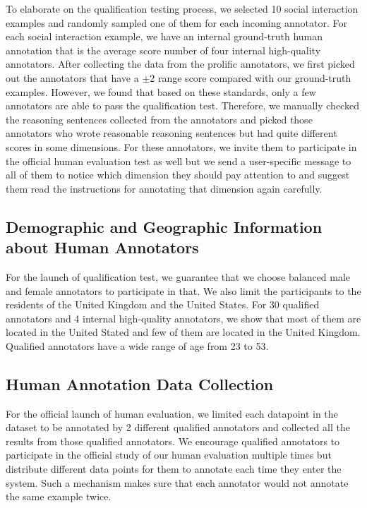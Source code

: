 To elaborate on the qualification testing process, we selected 10 social interaction examples and randomly sampled one of them for each incoming annotator. For each social interaction example, we have an internal ground-truth human annotation that is the average score number of four internal high-quality annotators. After collecting the data from the prolific annotators, we first picked out the annotators that have a $\pm$2 range score compared with our ground-truth examples. However, we found that based on these standards, only a few annotators are able to pass the qualification test. Therefore, we manually checked the reasoning sentences collected from the annotators and picked those annotators who wrote reasonable reasoning sentences but had quite different scores in some dimensions. For these annotators, we invite them to participate in the official human evaluation test as well but we send a user-specific message to all of them to notice which dimension they should pay attention to and suggest them read the instructions for annotating that dimension again carefully.

\subsection{Demographic and Geographic Information about Human Annotators}
\label{appendix:demographic-geographic-info}
For the launch of qualification test, we guarantee that we choose balanced male and female annotators to participate in that. We also limit the participants to the residents of the United Kingdom and the United States. For 30 qualified annotators and 4 internal high-quality annotators, we show that most of them are located in the United Stated and few of them are located in the United Kingdom. Qualified annotators have a wide range of age from 23 to 53.

\subsection{Human Annotation Data Collection}
\label{appendix:human-annotation-data-collection}
For the official launch of human evaluation, we limited each datapoint in the dataset to be annotated by 2 different qualified annotators and collected all the results from those qualified annotators. We encourage qualified annotators to participate in the official study of our human evaluation multiple times but distribute different data points for them to annotate each time they enter the system. Such a mechanism makes sure that each annotator would not annotate the same example twice.

